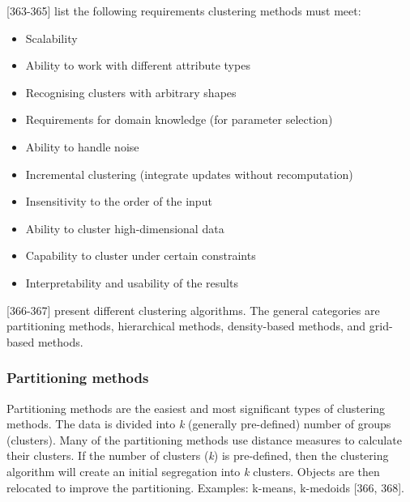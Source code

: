 \textcite{han2011data}[363-365] list the following requirements  clustering methods must meet:
\begin{itemize}
  \item Scalability
  \item Ability to work with different attribute types
  \item Recognising clusters with arbitrary shapes
  \item Requirements for domain knowledge (for parameter selection)
  \item Ability to handle noise
  \item Incremental clustering (integrate updates without recomputation)
  \item Insensitivity to the order of the input
  \item Ability to cluster high-dimensional data 
  \item Capability to cluster under certain constraints
  \item Interpretability and usability of the results
\end{itemize}


\textcite{han2011data}[366-367] present different clustering algorithms. The general categories are partitioning methods, hierarchical methods, density-based methods, and grid-based methods.


  \subsubsection{Partitioning methods}
  Partitioning methods are the easiest and most significant types of clustering methods. The data is divided into \textit{k} (generally pre-defined) number of groups (clusters). Many of the partitioning methods use distance measures to calculate their clusters. If the number of clusters (\textit{k}) is pre-defined, then the clustering algorithm will create an initial segregation into \textit{k} clusters. Objects are then relocated to improve the partitioning. Examples: k-means, k-medoids \autocite{han2011data}[366, 368].
  

